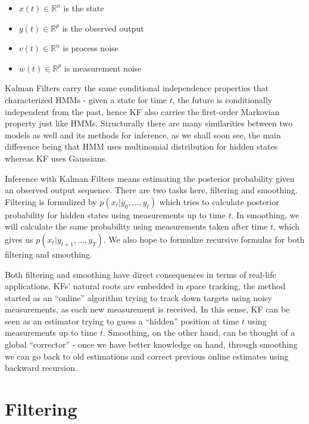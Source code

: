 \documentclass[a4paper,11pt]{article}
\begin{document}
\begin{itemize}
   \item $x(t) \in \mathbb{R}^n$ is the state
   \item $y(t) \in \mathbb{R}^p$ is the observed output
   \item $v(t) \in \mathbb{R}^n$ is process noise
   \item $w(t) \in \mathbb{R}^p$ is measurement noise
\end{itemize}

Kalman Filters carry the same conditional independence properties that
characterized HMMs - given a state for time $t$, the future is conditionally
independent from the past, hence KF also carries the first-order Markovian
property just like HMMs. Structurally there are many similarities between two
models as well and its methods for inference, as we shall soon see, the main
difference being that HMM uses multinomial distribution for hidden states
whereas KF uses Gaussians.

Inference with Kalman Filters means estimating the posterior probability given
an observed output sequence. There are two tasks here, filtering and
smoothing. Filtering is formulized by $p(x_t|y_0,...,y_t)$ which tries to
calculate posterior probability for hidden states using measurements up to time
$t$. In smoothing, we will calculate the same probability using measurements
taken after time $t$, which gives us $p(x_t|y_{t+1},...,y_T)$. We also hope to
formulize recursive formulas for both filtering and smoothing.

Both filtering and smoothing have direct consequences in terms of real-life
applications. KFs' natural roots are embedded in space tracking, the method
started as an ``online'' algorithm trying to track down targets using noisy
measurements, as each new measurement is received. In this sense, KF can be seen
as an estimator trying to guess a ``hidden'' position at time $t$ using
measurements up to time $t$. Smoothing, on the other hand, can be thought of a
global ``corrector'' - once we have better knowledge on hand, through smoothing
we can go back to old estimations and correct previous online estimates using
backward recursion.


\section{Filtering}
\end{document}
